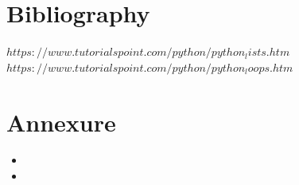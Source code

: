 \documentclass[12pt]{article}
\begin{document}
\section{Bibliography}
{
$https://www.tutorialspoint.com/python/python_lists.htm$\\
$https://www.tutorialspoint.com/python/python_loops.htm$\\

}
\newpage

\section{Annexure}
\begin{itemize}

\item
\item



\end{itemize}
\end{document}
